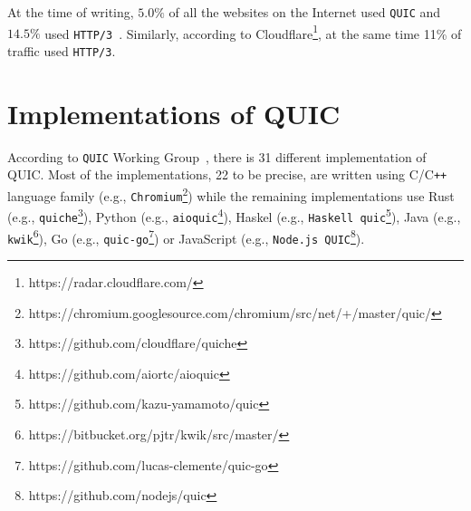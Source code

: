 \documentclass[12pt,a4paper]{report}
\begin{document}
At the time of writing, $5.0\%$ of all the websites on the Internet used \texttt{QUIC} and $14.5\%$ used \texttt{HTTP/3}~\cite{bib_Adoption_comparison_Between_http2_http3_quic}.
Similarly, according to Cloudflare\footnote{https://radar.cloudflare.com/}, at the same time 11\% of traffic used \texttt{HTTP/3}.



\section{Implementations of QUIC} \label{List_of_QUIC_implementations}
According to \texttt{QUIC} Working Group~\cite{number_of_QUIC_implementations}, there is 31 different implementation of QUIC. Most of the implementations, 22 to be precise, are written using C/C\texttt{++} language family (e.g., \texttt{Chromium}\footnote{https://chromium.googlesource.com/chromium/src/net/+/master/quic/}) while the remaining implementations use Rust (e.g., \texttt{quiche}\footnote{https://github.com/cloudflare/quiche}), Python (e.g., \texttt{aioquic}\footnote{https://github.com/aiortc/aioquic}), Haskel (e.g., \texttt{Haskell quic}\footnote{https://github.com/kazu-yamamoto/quic}), Java (e.g., \texttt{kwik}\footnote{https://bitbucket.org/pjtr/kwik/src/master/}), Go (e.g., \texttt{quic-go}\footnote{https://github.com/lucas-clemente/quic-go}) or JavaScript (e.g., \texttt{Node.js QUIC}\footnote{https://github.com/nodejs/quic}).
\end{document}
